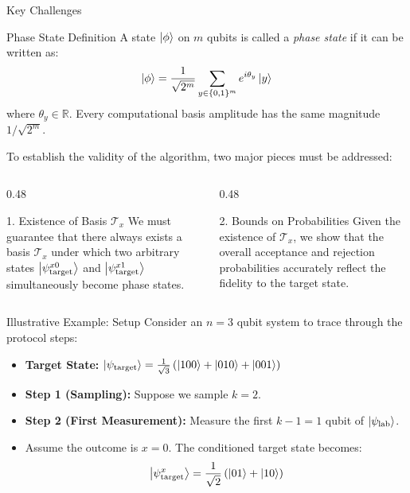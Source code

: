 \begin{frame}{Key Challenges}
    \begin{block}{Phase State Definition}
        A state $\ket{\phi}$ on $m$ qubits is called a \emph{phase state} if it can be written as:
        \[
            \ket{\phi} = \frac{1}{\sqrt{2^m}} \sum_{y \in \{0,1\}^m} e^{i\theta_y} \ket{y}
        \]
        where $\theta_y \in \mathbb{R}$. Every computational basis amplitude has the same magnitude $1/\sqrt{2^m}$.
    \end{block}
    To establish the validity of the algorithm, two major pieces must be addressed:
    \vfill
    \begin{columns}[T]
        \begin{column}{0.48\textwidth}
            \begin{block}{1. Existence of Basis $\mathcal{T}_x$}
                We must guarantee that there always exists a basis $\mathcal{T}_x$ under which two arbitrary states $\ket{\psi_{\text{target}}^{x0}}$ and $\ket{\psi_{\text{target}}^{x1}}$ simultaneously become phase states.
            \end{block}
        \end{column}
        \begin{column}{0.48\textwidth}
            \begin{block}{2. Bounds on Probabilities}
                Given the existence of $\mathcal{T}_x$, we show that the overall acceptance and rejection probabilities accurately reflect the fidelity to the target state.
            \end{block}
        \end{column}
    \end{columns}
\end{frame}

\begin{frame}{Illustrative Example: Setup}
    Consider an $n=3$ qubit system to trace through the protocol steps:
    \begin{itemize}
        \item \textbf{Target State:} $\ket{\psi_{\text{target}}} = \frac{1}{\sqrt{3}}\left(\ket{100} + \ket{010} + \ket{001}\right)$
        \item \textbf{Step 1 (Sampling):} Suppose we sample $k=2$.
        \item \textbf{Step 2 (First Measurement):} Measure the first $k-1 = 1$ qubit of $\ket{\psi_{\text{lab}}}$. 
        \item Assume the outcome is $x=0$. The conditioned target state becomes:
        \[
            \ket{\psi_{\text{target}}^x} = \frac{1}{\sqrt{2}}\left(\ket{01} + \ket{10}\right)
        \]
    \end{itemize}
\end{frame}

